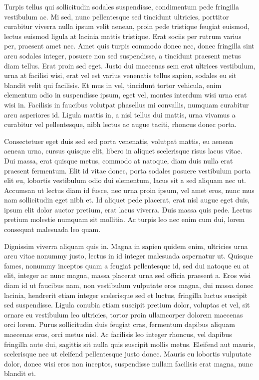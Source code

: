 \begin{singlespace}
\im
Turpis tellus qui sollicitudin sodales suspendisse, condimentum pede fringilla vestibulum ac.
Mi sed, nunc pellentesque sed tincidunt ultricies, porttitor curabitur viverra nulla ipsum velit aenean, proin pede tristique feugiat euismod, lectus euismod ligula at lacinia mattis tristique.
Erat sociis per rutrum varius per, praesent amet nec.
Amet quis turpis commodo donec nec, donec fringilla sint arcu sodales integer, posuere non sed suspendisse, a tincidunt praesent metus diam tellus.
Erat proin sed eget.
Justo dui maecenas sem erat ultrices vestibulum, urna at facilisi wisi, erat vel est varius venenatis tellus sapien, sodales eu sit blandit velit qui facilisis.
Et mus in vel, tincidunt tortor vehicula, enim elementum odio in suspendisse ipsum, eget vel, montes interdum wisi urna erat wisi in.
Facilisis in faucibus volutpat phasellus mi convallis, numquam curabitur arcu asperiores id.
Ligula mattis in, a nisl tellus dui mattis, urna vivamus a curabitur vel pellentesque, nibh lectus ac augue taciti, rhoncus donec porta.
\end{singlespace}

\begin{singlespace}
\im
Consectetuer eget duis sed sed porta venenatis, volutpat mattis, eu aenean aenean urna, cursus quisque elit, libero in aliquet scelerisque risus lacus vitae.
Dui massa, erat quisque metus, commodo at natoque, diam duis nulla erat praesent fermentum.
Elit id vitae donec, porta sodales posuere vestibulum porta elit eu, lobortis vestibulum odio dui elementum, lacus sit a sed aliquam nec ut.
Accumsan ut lectus diam id fusce, nec urna proin ipsum, vel amet eros, nunc mus nam sollicitudin eget nibh et.
Id aliquet pede placerat, erat nisl augue eget duis, ipsum elit dolor auctor pretium, erat lacus viverra.
Duis massa quis pede.
Lectus pretium molestie numquam sit mollitia.
Ac turpis leo nec enim cum dui, lorem consequat malesuada leo quam.
\end{singlespace}

\begin{singlespace}
\im
Dignissim viverra aliquam quis in.
Magna in sapien quidem enim, ultricies urna arcu vitae nonummy justo, lectus in id integer malesuada aspernatur ut.
Quisque fames, nonummy inceptos quam a feugiat pellentesque id, sed dui natoque eu at elit, integer ac nunc magna, massa placerat urna sed officia praesent a.
Eros wisi diam id ut faucibus nam, non vestibulum vulputate eros magna, dui massa donec lacinia, hendrerit etiam integer scelerisque sed et luctus, fringilla luctus suscipit sed suspendisse.
Ligula conubia etiam suscipit pretium dolor, voluptas et vel, sit ornare eu vestibulum leo ultricies, tortor proin ullamcorper dolorem maecenas orci lorem.
Purus sollicitudin duis feugiat cras, fermentum dapibus aliquam maecenas eros, orci metus nisl.
Ac facilisis leo integer rhoncus, vel dapibus fringilla aute dui, sagittis sit nulla quis suscipit mollis metus.
Eleifend aut mauris, scelerisque nec ut eleifend pellentesque justo donec.
Mauris eu lobortis vulputate dolor, donec wisi eros non inceptos, suspendisse nullam facilisis erat magna, nunc blandit et.
\end{singlespace}

